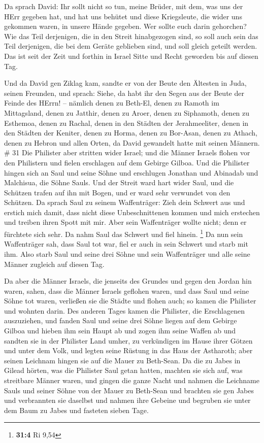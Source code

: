 Da sprach David: Ihr sollt nicht so tun, meine Brüder, mit
dem, was uns der HErr gegeben hat, und hat uns behütet und diese
Kriegsleute, die wider uns gekommen waren, in unsere Hände gegeben.
 Wer sollte euch darin gehorchen? Wie das Teil derjenigen,
die in den Streit hinabgezogen sind, so soll auch sein das Teil
derjenigen, die bei dem Geräte geblieben sind, und soll gleich geteilt
werden.  Das ist seit der Zeit und forthin in Israel Sitte
und Recht geworden bis auf diesen Tag.

 Und da David gen Ziklag kam, sandte er von der Beute den
Ältesten in Juda, seinen Freunden, und sprach: Siehe, da habt ihr den
Segen aus der Beute der Feinde des HErrn! --  nämlich denen
zu Beth-El, denen zu Ramoth im Mittagsland, denen zu Jatthir,
 denen zu Aroer, denen zu Siphamoth, denen zu Esthemoa,
 denen zu Rachal, denen in den Städten der Jerahmeeliter,
denen in den Städten der Keniter,  denen zu Horma, denen zu
Bor-Asan, denen zu Athach,  denen zu Hebron und allen
Orten, da David gewandelt hatte mit seinen Männern. \# 31 
Die Philister aber stritten wider Israel; und die Männer Israels flohen
vor den Philistern und fielen erschlagen auf dem Gebirge Gilboa.
 Und die Philister hingen sich an Saul und seine Söhne und
erschlugen Jonathan und Abinadab und Malchisua, die Söhne Sauls.
 Und der Streit ward hart wider Saul, und die Schützen
trafen auf ihn mit Bogen, und er ward sehr verwundet von den Schützen.
 Da sprach Saul zu seinem Waffenträger: Zieh dein Schwert
aus und erstich mich damit, dass nicht diese Unbeschnittenen kommen und
mich erstechen und treiben ihren Spott mit mir. Aber sein Waffenträger
wollte nicht; denn er fürchtete sich sehr. Da nahm Saul das Schwert und
fiel hinein. \footnote{\textbf{31:4} Ri 9,54}  Da nun sein
Waffenträger sah, dass Saul tot war, fiel er auch in sein Schwert und
starb mit ihm.  Also starb Saul und seine drei Söhne und
sein Waffenträger und alle seine Männer zugleich auf diesen Tag.

 Da aber die Männer Israels, die jenseits des Grundes und
gegen den Jordan hin waren, sahen, dass die Männer Israels geflohen
waren, und dass Saul und seine Söhne tot waren, verließen sie die Städte
und flohen auch; so kamen die Philister und wohnten darin. 
Des anderen Tages kamen die Philister, die Erschlagenen auszuziehen, und
fanden Saul und seine drei Söhne liegen auf dem Gebirge Gilboa
 und hieben ihm sein Haupt ab und zogen ihm seine Waffen ab
und sandten sie in der Philister Land umher, zu verkündigen im Hause
ihrer Götzen und unter dem Volk,  und legten seine Rüstung
in das Haus der Astharoth; aber seinen Leichnam hingen sie auf die Mauer
zu Beth-Sean.  Da die zu Jabes in Gilead hörten, was die
Philister Saul getan hatten,  machten sie sich auf, was
streitbare Männer waren, und gingen die ganze Nacht und nahmen die
Leichname Sauls und seiner Söhne von der Mauer zu Beth-Sean und brachten
sie gen Jabes und verbrannten sie daselbst  und nahmen ihre
Gebeine und begruben sie unter dem Baum zu Jabes und fasteten sieben
Tage.
